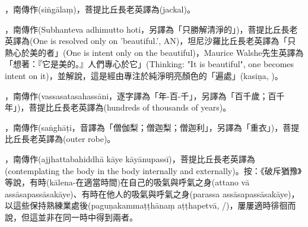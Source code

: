 \startitemgroup[noteitems]
\item{}，南傳作(siṅgālaṃ)，菩提比丘長老英譯為(jackal)。
\stopitemgroup

\startitemgroup[noteitems]
\item{}，南傳作(Subhanteva adhimutto hoti，另譯為「只勝解清淨的」)，菩提比丘長老英譯為(One is resolved only on 'beautiful.', AN)，坦尼沙羅比丘長老英譯為「只熱心於美的者」(One is intent only on the beautiful)，Maurice Walshe先生英譯為「想著：『它是美的。』人們專心於它」(Thinking: "It is beautiful", one becomes intent on it)，並解說，這是經由專注於純淨明亮顏色的「遍處」(kasiṇa, )。
\stopitemgroup

\startitemgroup[noteitems]
\item{}，南傳作(vassasatasahassāni，逐字譯為「年-百-千」，另譯為「百千歲；百千年」)，菩提比丘長老英譯為(hundreds of thousands of years)。
\stopitemgroup

\startitemgroup[noteitems]
\item{}，南傳作(saṅghāṭi，音譯為「僧伽梨；僧迦梨；僧迦利」，另譯為「重衣」)，菩提比丘長老英譯為(outer robe)。
\stopitemgroup

\startitemgroup[noteitems]
\item{}，南傳作(ajjhattabahiddhā kāye kāyānupassī)，菩提比丘長老英譯為(contemplating the body in the body internally and externally)。按：《破斥猶豫》等說，有時(kālena-在適當時間)在自己的吸氣與呼氣之身(attano vā assāsapassāsakāye)、有時在他人的吸氣與呼氣之身(parassa assāsapassāsakāye)，以這些保持熟練業處後(paguṇakammaṭṭhānaṃ aṭṭhapetvā, /)，屢屢適時徘徊而說，但這並非在同一時中得到兩者。
\stopitemgroup


